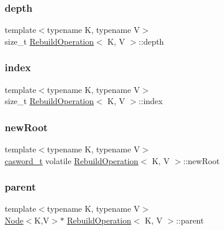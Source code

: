 \mbox{\label{structRebuildOperation_aec85895bd9bafd0be35fda4e4c2f3e42}} 
\subsubsection{\texorpdfstring{depth}{depth}}
{\footnotesize\ttfamily template$<$typename K, typename V$>$ \\
size\+\_\+t \hyperlink{structRebuildOperation}{Rebuild\+Operation}$<$ K, V $>$\+::depth}

\mbox{\label{structRebuildOperation_a5f1dcb258750901e88f71be460618292}} 
\subsubsection{\texorpdfstring{index}{index}}
{\footnotesize\ttfamily template$<$typename K, typename V$>$ \\
size\+\_\+t \hyperlink{structRebuildOperation}{Rebuild\+Operation}$<$ K, V $>$\+::index}

\mbox{\label{structRebuildOperation_a67508b4b8d5bf51ed824dd3a7e386e57}} 
\subsubsection{\texorpdfstring{new\+Root}{newRoot}}
{\footnotesize\ttfamily template$<$typename K, typename V$>$ \\
\hyperlink{rq__unsafe_8h_ad45142aaf2ff20a036dc6242b8483e9c}{casword\+\_\+t} volatile \hyperlink{structRebuildOperation}{Rebuild\+Operation}$<$ K, V $>$\+::new\+Root}

\mbox{\label{structRebuildOperation_a1e175f856fceb99887d704c44ea286bd}} 
\subsubsection{\texorpdfstring{parent}{parent}}
{\footnotesize\ttfamily template$<$typename K, typename V$>$ \\
\hyperlink{classNode}{Node}$<$K,V$>$$\ast$ \hyperlink{structRebuildOperation}{Rebuild\+Operation}$<$ K, V $>$\+::parent}

